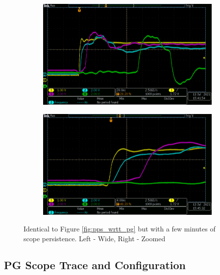 \documentclass[]{article}
\begin{document}
\begin{figure}[H]
	\begin{subfigure}{0.5\textwidth}
		\includegraphics[width=0.9\linewidth]{images/wrts_source_add_pps_persist_wide}
	\end{subfigure}
	\begin{subfigure}{0.5\textwidth}
		\includegraphics[width=0.9\linewidth]{images/wrts_source_add_pps_persist_zoom}
	\end{subfigure}
	
	\caption{Identical to Figure \ref{fig:pps_wrtt_pg} but with a few minutes of scope persistence. Left - Wide, Right - Zoomed}
	\label{all_sigs_comp}
\end{figure}

\pagebreak
\subsection{PG Scope Trace and Configuration}\label{pg_sect}
\end{document}
